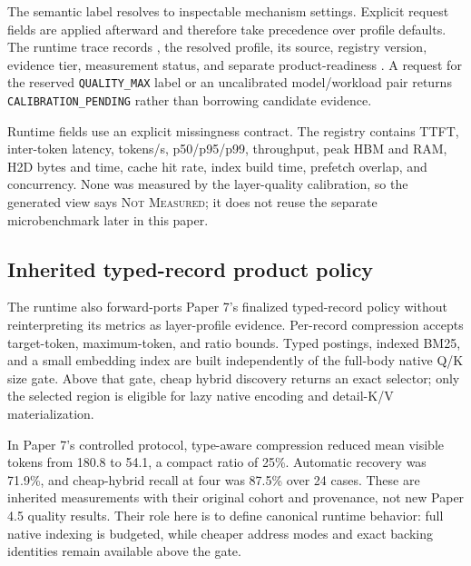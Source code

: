 \documentclass[11pt]{article}
\newcommand{\QualityMax}{\texttt{QUALITY\_\allowbreak MAX}}
\newcommand{\CalibrationPending}{\texttt{CALIBRATION\_\allowbreak PENDING}}
\begin{document}
The semantic label resolves to inspectable mechanism settings. Explicit request
fields are applied afterward and therefore take precedence over profile
defaults. The runtime trace records ,
the resolved profile, its source, registry version, evidence tier, measurement
status, and separate product-readiness . A request for
the reserved \QualityMax{} label or an uncalibrated model/workload pair
returns \CalibrationPending{} rather than borrowing candidate evidence.

\begin{table}[H]
\centering
\caption{Resolved technical realization. Counts refer to eligible physical
layers. Compression and search are fixed controls in this semantic smoke.}
\scriptsize

\normalsize
\end{table}

Runtime fields use an explicit missingness contract. The registry contains
TTFT, inter-token latency, tokens/s, p50/p95/p99, throughput, peak HBM and RAM,
H2D bytes and time, cache hit rate, index build time, prefetch overlap, and
concurrency. None was measured by the layer-quality calibration, so the
generated view says \textsc{Not Measured}; it does not reuse the separate
microbenchmark later in this paper.

\begin{table}[H]
\centering
\caption{Physical realization fields for balanced semantic rows. Missing
serving measurements remain explicit.}
\small

\normalsize
\end{table}

\subsection{Inherited typed-record product policy}

The runtime also forward-ports Paper 7's finalized typed-record policy without
reinterpreting its metrics as layer-profile evidence. Per-record compression
accepts target-token, maximum-token, and ratio bounds. Typed postings, indexed
BM25, and a small embedding index are built independently of the full-body
native Q/K size gate. Above that gate, cheap hybrid discovery returns an exact
selector; only the selected region is eligible for lazy native encoding and
detail-K/V materialization.

In Paper 7's controlled protocol, type-aware compression reduced mean visible
tokens from 180.8 to 54.1, a compact ratio of 25\%. Automatic recovery was
71.9\%, and cheap-hybrid recall at four was 87.5\% over 24 cases. These are
inherited measurements with their original cohort and provenance, not new
Paper 4.5 quality results. Their role here is to define canonical runtime
behavior: full native indexing is budgeted, while cheaper address modes and
exact backing identities remain available above the gate.
\end{document}
